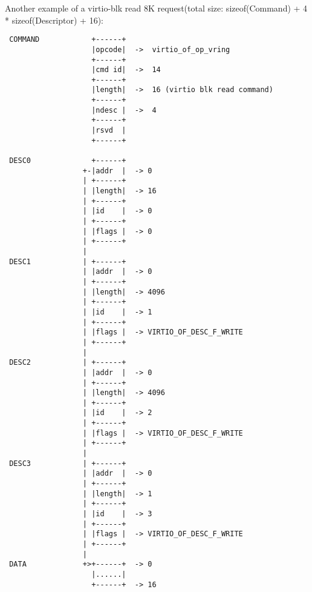 Another example of a virtio-blk read 8K request(total size: sizeof(Command) + 4 * sizeof(Descriptor) + 16):
\begin{lstlisting}
 COMMAND            +------+
                    |opcode|  ->  virtio_of_op_vring
                    +------+
                    |cmd id|  ->  14
                    +------+
                    |length|  ->  16 (virtio blk read command)
                    +------+
                    |ndesc |  ->  4
                    +------+
                    |rsvd  |
                    +------+

 DESC0              +------+
                  +-|addr  |  -> 0
                  | +------+
                  | |length|  -> 16
                  | +------+
                  | |id    |  -> 0
                  | +------+
                  | |flags |  -> 0
                  | +------+
                  |
 DESC1            | +------+
                  | |addr  |  -> 0
                  | +------+
                  | |length|  -> 4096
                  | +------+
                  | |id    |  -> 1
                  | +------+
                  | |flags |  -> VIRTIO_OF_DESC_F_WRITE
                  | +------+
                  |
 DESC2            | +------+
                  | |addr  |  -> 0
                  | +------+
                  | |length|  -> 4096
                  | +------+
                  | |id    |  -> 2
                  | +------+
                  | |flags |  -> VIRTIO_OF_DESC_F_WRITE
                  | +------+
                  |
 DESC3            | +------+
                  | |addr  |  -> 0
                  | +------+
                  | |length|  -> 1
                  | +------+
                  | |id    |  -> 3
                  | +------+
                  | |flags |  -> VIRTIO_OF_DESC_F_WRITE
                  | +------+
                  |
 DATA             +>+------+  -> 0
                    |......|
                    +------+  -> 16
\end{lstlisting}

